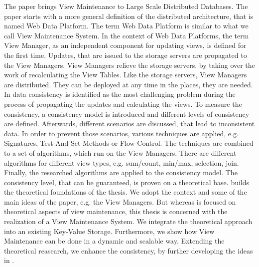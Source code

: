 \documentclass[11pt,a4paper,bibtotoc,idxtotoc,headsepline,footsepline,footexclude,BCOR12mm,DIV13]{scrbook}
\begin{document}
The paper \cite{jacobsen:viewmaintenance}  brings View Maintenance to Large Scale Distributed Databases. The paper starts with a more general definition of the distributed architecture, that is named Web Data Platform. The term Web Data Platform is similar to what we call View Maintenance System. In the context of Web Data Platforms, the term View Manager, as an independent component for updating views, is defined for the first time. Updates, that are issued to the storage servers are propagated to the View Managers.  View Managers relieve the storage servers, by taking over the work of recalculating the View Tables. Like the storage servers, View Managers are distributed. They can be deployed at any time in the places, they are needed. In \cite{jacobsen:viewmaintenance} data consistency is identified as the most challenging problem during the process of propagating the updates and calculating the views. To measure the consistency, a consistency model is introduced and different levels of consistency are defined. Afterwards, different scenarios are discussed, that lead to inconsistent data. In order to prevent those scenarios, various techniques are applied, e.g. Signatures, Test-And-Set-Methods or Flow Control. The techniques are combined to a set of algorithms, which run on the View Managers. There are different algorithms for different view types, e.g. sum/count, min/max, selection, join. Finally, the researched algorithms are applied to the consistency model. The consistency level, that can be guaranteed, is proven on a theoretical base. \cite{jacobsen:viewmaintenance} builds the theoretical foundations of the thesis. We adopt the context and some of the main ideas of the paper, e.g. the View Managers. But whereas \cite{jacobsen:viewmaintenance} is focused on theoretical aspects of view maintenance, this thesis is concerned with the realization of a View Maintenance System.  We integrate the theoretical approach into an existing Key-Value Storage. Furthermore, we show how View Maintenance can be done in a dynamic and scalable way. Extending the theoretical reasearch, we enhance the consistency, by further developing the ideas in \cite{jacobsen:viewmaintenance}.
\end{document}
